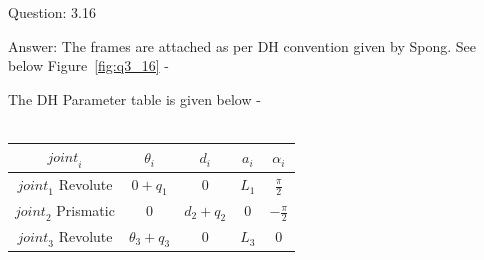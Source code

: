 \documentclass[a4paper]{article}
\begin{document}
\begin{qalist}
		\item[Question: 3.16] \setcounter{equation}{0} %
		\item[Answer:] The frames are attached as per DH convention given by Spong. See below Figure~\ref{fig:q3_16} -\\
			\begin{minipage}{\linewidth}
				\vspace{0.5cm}
				\centering
				\label{fig:q3_16}
				\vspace{0.5cm}
			\end{minipage}
			The DH Parameter table is given below - \\ \\
			\begin{minipage}{\linewidth}
				\centering
				\begin{tabular}{|c|c|c|c|c|}
					\hline
					${joint}_{i}$ & ${\theta}_{i}$ & ${d}_{i}$ & ${a}_{i}$ & ${\alpha}_{i}$\\
					\hline \hline
					${joint}_{1}$ Revolute & $0 + {q}_{1}$ & $0$ & ${L}_{1}$ & $\frac{\pi}{2}$\\
					\hline
					${joint}_{2}$ Prismatic & $0$ & ${d}_{2} + {q}_{2}$ & $0$ & $-\frac{\pi}{2}$\\
					\hline
					${joint}_{3}$ Revolute & ${\theta}_{3} + {q}_{3}$ & $0$ & ${L}_{3}$ & $0 $\\
					\hline
				\end{tabular}
			\end{minipage}		
			

\end{qalist}
\end{document}
